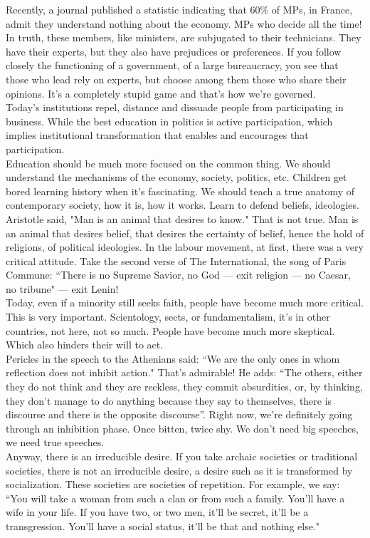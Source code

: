 Recently, a journal published a statistic indicating that 60\% of MPs, in France, admit they understand nothing about the economy. MPs who decide all the time! In truth, these members, like ministers, are subjugated to their technicians. They have their experts, but they also have prejudices or preferences. If you follow closely the functioning of a government, of a large bureaucracy, you see that those who lead rely on experts, but choose among them those who share their opinions. It's a completely stupid game and that's how we're governed.\\
Today's institutions repel, distance and dissuade people from participating in business. While the best education in politics is active participation, which implies institutional transformation that enables and encourages that participation.\\
Education should be much more focused on the common thing. We should understand the mechanisms of the economy, society, politics, etc. Children get bored learning history when it's fascinating. We should teach a true anatomy of contemporary society, how it is, how it works. Learn to defend beliefs, ideologies.\\
Aristotle said, "Man is an animal that desires to know." That is not true. Man is an animal that desires belief, that desires the certainty of belief, hence the hold of religions, of political ideologies. In the labour movement, at first, there was a very critical attitude. Take the second verse of The International, the song of Paris Commune: ``There is no Supreme Savior, no God --- exit religion --- no Caesar, no tribune" --- exit Lenin!\\
Today, even if a minority still seeks faith, people have become much more critical. This is very important. Scientology, sects, or fundamentalism, it's in other countries, not here, not so much. People have become much more skeptical. Which also hinders their will to act.\\
Pericles in the speech to the Athenians said: ``We are the only ones in whom reflection does not inhibit action." That's admirable! He adds: ``The others, either they do not think and they are reckless, they commit absurdities, or, by thinking, they don't manage to do anything because they say to themselves, there is discourse and there is the opposite discourse''. Right now, we're definitely going through an inhibition phase. Once bitten, twice shy. We don't need big speeches, we need true speeches.\\
Anyway, there is an irreducible desire. If you take archaic societies or traditional societies, there is not an irreducible desire, a desire such as it is transformed by socialization. These societies are societies of repetition. For example, we say: ``You will take a woman from such a clan or from such a family. You'll have a wife in your life. If you have two, or two men, it'll be secret, it'll be a transgression. You'll have a social status, it'll be that and nothing else."\\
